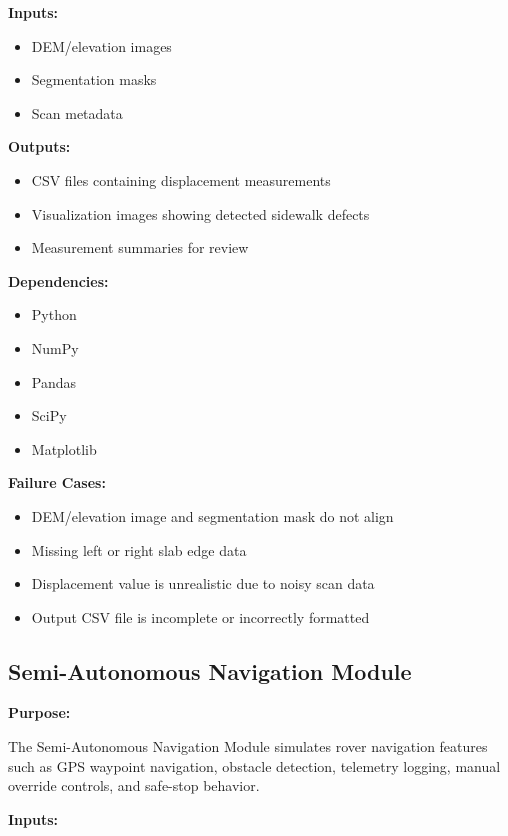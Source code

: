 \documentclass{article}
\begin{document}
\textbf{Inputs:}

\begin{itemize}
    \item DEM/elevation images
    \item Segmentation masks
    \item Scan metadata
\end{itemize}

\textbf{Outputs:}

\begin{itemize}
    \item CSV files containing displacement measurements
    \item Visualization images showing detected sidewalk defects
    \item Measurement summaries for review
\end{itemize}

\textbf{Dependencies:}

\begin{itemize}
    \item Python
    \item NumPy
    \item Pandas
    \item SciPy
    \item Matplotlib
\end{itemize}

\textbf{Failure Cases:}

\begin{itemize}
    \item DEM/elevation image and segmentation mask do not align
    \item Missing left or right slab edge data
    \item Displacement value is unrealistic due to noisy scan data
    \item Output CSV file is incomplete or incorrectly formatted
\end{itemize}

\subsection{Semi-Autonomous Navigation Module}

\textbf{Purpose:}

The Semi-Autonomous Navigation Module simulates rover navigation features such as GPS waypoint navigation, obstacle detection, telemetry logging, manual override controls, and safe-stop behavior.

\textbf{Inputs:}
\end{document}
